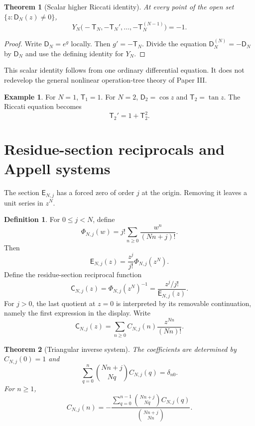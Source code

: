 \documentclass[11pt]{article}
\newtheorem{theorem}{Theorem}[section]
\theoremstyle{definition}
\newtheorem{definition}[definition]{Definition}
\newtheorem{example}[example]{Example}
\theoremstyle{remark}
\newcommand{\Dfun}{\mathsf D}
\newcommand{\Efun}{\mathsf E}
\newcommand{\Tfun}{\mathsf T}
\newcommand{\Cfun}{\mathsf C}
\begin{document}
\begin{theorem}[Scalar higher Riccati identity]\label{thm:higher_riccati}
At every point of the open set $\{z:\Dfun_N(z)\ne0\}$,
\[
Y_N\bigl(
-\Tfun_N,
-\Tfun_N',
\ldots,
-\Tfun_N^{(N-1)}
\bigr)
=-1.
\]
\end{theorem}

\begin{proof}
Write $\Dfun_N=e^g$ locally.  Then $g'=-\Tfun_N$.  Divide the equation $\Dfun_N^{(N)}=-\Dfun_N$ by $\Dfun_N$ and use the defining identity for $Y_N$.
\end{proof}

This scalar identity follows from one ordinary differential equation. It does
not redevelop the general nonlinear operation-tree theory of Paper III.

\begin{example}\label{ex:ordinary_tangent}
For $N=1$, $\Tfun_1=1$.  For $N=2$, $\Dfun_2=\cos z$ and $\Tfun_2=\tan z$.  The Riccati equation becomes
\[
\Tfun_2'=1+\Tfun_2^2.
\]
\end{example}

\section{Residue-section reciprocals and Appell systems}\label{sec:residue_section}

The section $\Efun_{N,j}$ has a forced zero of order $j$ at the origin.  Removing it leaves a unit series in $z^N$.

\begin{definition}\label{def:normalized_section}
For $0\leq j<N$, define
\[
\Phi_{N,j}(w)
=
j!\sum_{n\geq0}\frac{w^n}{(Nn+j)!}.
\]
Then
\[
\Efun_{N,j}(z)
=
\frac{z^j}{j!}\Phi_{N,j}(z^N).
\]
Define the residue-section reciprocal function
\[
\Cfun_{N,j}(z)
=
\Phi_{N,j}(z^N)^{-1}
=
\frac{z^j/j!}{\Efun_{N,j}(z)}.
\]
For $j>0$, the last quotient at $z=0$ is interpreted by its removable
continuation, namely the first expression in the display.
Write
\[
\Cfun_{N,j}(z)
=
\sum_{n\geq0}C_{N,j}(n)\frac{z^{Nn}}{(Nn)!}.
\]
\end{definition}

\begin{theorem}[Triangular inverse system]\label{thm:triangular_inverse}
The coefficients are determined by $C_{N,j}(0)=1$ and
\[
\sum_{q=0}^{n}
\binom{Nn+j}{Nq}
C_{N,j}(q)
=
\delta_{n0}.
\]
For $n\geq1$,
\[
C_{N,j}(n)
=
-
\frac{
\displaystyle\sum_{q=0}^{n-1}
\binom{Nn+j}{Nq}C_{N,j}(q)
}{
\displaystyle\binom{Nn+j}{Nn}
}.
\]
\end{theorem}
\end{document}
